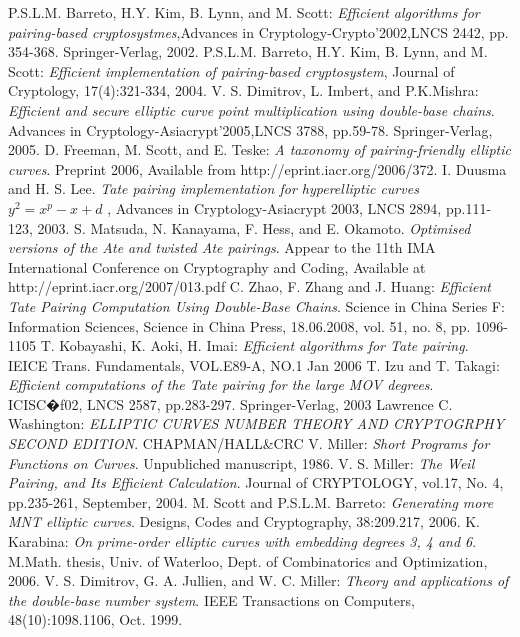 \documentclass[a4j,oneside,openany]{jsbook}
\begin{document}
\begin{thebibliography}{99}
	 P.S.L.M. Barreto, H.Y. Kim, B. Lynn, and M. Scott: {\em Efficient algorithms for pairing-based cryptosystmes},Advances in Cryptology-Crypto'2002,LNCS 2442, pp. 354-368. Springer-Verlag, 2002.
	 P.S.L.M. Barreto, H.Y. Kim, B. Lynn, and M. Scott: {\em Efficient implementation of pairing-based cryptosystem}, Journal of Cryptology, 17(4):321-334, 2004.
	 V. S. Dimitrov, L. Imbert, and P.K.Mishra: {\em Efficient and secure elliptic curve point multiplication using double-base chains}. Advances in Cryptology-Asiacrypt'2005,LNCS 3788, pp.59-78. Springer-Verlag, 2005.
	 D. Freeman, M. Scott, and E. Teske: {\em A taxonomy of pairing-friendly elliptic curves}. Preprint 2006, Available from http://eprint.iacr.org/2006/372.
	 I. Duusma and H. S. Lee. {\em Tate pairing implementation for hyperelliptic curves $y^2 = x^p -x + d$ }, Advances in Cryptology-Asiacrypt 2003, LNCS 2894, pp.111-123, 2003.
	 S. Matsuda, N. Kanayama, F. Hess, and E. Okamoto. {\em Optimised versions of the Ate and twisted Ate pairings}. Appear to the 11th IMA International Conference on Cryptography and Coding, Available at http://eprint.iacr.org/2007/013.pdf
	 C. Zhao, F. Zhang and J. Huang: {\em Efficient Tate Pairing Computation Using Double-Base Chains}. Science in China Series F: Information Sciences, Science in China Press, 18.06.2008, vol. 51, no. 8, pp. 1096-1105
	 T. Kobayashi, K. Aoki, H. Imai: {\em Efficient algorithms for Tate pairing}. IEICE Trans. Fundamentals, VOL.E89-A, NO.1 Jan 2006
	 T. Izu and T. Takagi: {\em Efficient computations of the Tate pairing for the large MOV degrees}. ICISC�f02, LNCS 2587, pp.283-297. Springer-Verlag, 2003
	 Lawrence C. Washington: {\em ELLIPTIC CURVES NUMBER THEORY AND CRYPTOGRPHY SECOND EDITION}. CHAPMAN/HALL\&CRC
	 V. Miller: {\em Short Programs for Functions on Curves}.  Unpubliched manuscript, 1986.
	 V. S. Miller: {\em The Weil Pairing, and Its Efficient Calculation}. Journal of CRYPTOLOGY, vol.17, No. 4, pp.235-261, September, 2004.
	 M. Scott and P.S.L.M. Barreto: {\em Generating more MNT elliptic curves}. Designs, Codes and Cryptography, 38:209.217, 2006.
	 K. Karabina: {\em On prime-order elliptic curves with embedding degrees 3, 4 and 6}. M.Math. thesis, Univ. of Waterloo, Dept. of Combinatorics and Optimization, 2006.
	V. S. Dimitrov, G. A. Jullien, and W. C. Miller: {\em Theory and applications of the double-base number system}. IEEE Transactions on Computers, 48(10):1098.1106, Oct. 1999.
\end{thebibliography}
\end{document}

